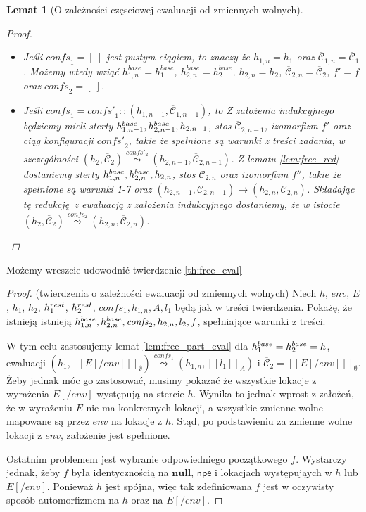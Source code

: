 \documentclass[]{pracamgr}
\renewcommand \| {\hspace{0.75em} | \hspace{0.75em} }
\renewcommand \[ {[\![}
\renewcommand \] {]\!]}
\newcommand \eval [1] {\overset{#1}{\leadsto}}
\newtheorem{lemma}{Lemat}
\theoremstyle{definition}
\newcommand{\jnull}{\mathbf{null}\xspace}
\newcommand{\ctxt}{\mathcal{C}\xspace}
\newcommand{\ctxts}{\overline{\ctxt}}
\newcommand{\npe}{\mathsf{npe}\xspace}
\begin{document}
\begin{lemma}[O zależności częsciowej ewaluacji od zmiennych wolnych]{\ }
\begin{proof}
\begin{itemize}
 \item Jeśli $\mathit{confs}_1 = [\ ]$ jest pustym ciągiem, to znaczy że $h_{1,n} = h_1$ oraz
 $\ctxts_{1,n} = \ctxts_1$.
 Możemy wtedy wziąć $h_{1,n}^{base} = h_1^{base}$, $h_{2,n}^{base} = h_2^{base}$,
 $h_{2,n} = h_2$, $\ctxts_{2,n} = \ctxts_2$, $f' = f$ oraz $\mathit{confs}_2 = [\ ]$.
 \item Jeśli $\mathit{confs}_1 = \mathit{confs'}_1 :: (h_{1,n-1}, \ctxts_{1,n-1})$, to
 Z założenia indukcyjnego będziemy mieli
 sterty $h^{base}_{1, n-1}, h^{base}_{2, n-1}, h_{2, n-1}$, stos $\ctxts_{2, n-1}$, izomorfizm $f'$
 oraz ciąg konfiguracji $\mathit{confs'}_2$, takie że spełnione są warunki z treści zadania,
 w szczególności $(h_2, \ctxts_2) \eval{confs'_2} (h_{2,n-1}, \ctxts_{2, n-1})$.
 Z lematu \ref{lem:free_red} dostaniemy 
 sterty $h^{base}_{1, n}, h^{base}_{2, n}, h_{2, n}$, stos $\ctxts_{2, n}$ oraz izomorfizm $f''$, takie że
 spełnione są warunki 1-7 oraz
 $(h_{2,n-1}, \ctxts_{2,n-1}) \rightarrow (h_{2, n}, \ctxts_{2, n})$.
 Składając tę redukcję z ewaluacją z założenia indukcyjnego dostaniemy, że w istocie
 $(h_2, \ctxts_2) \eval{confs_2} (h_{2, n}, \ctxts_{2, n})$.
\end{itemize}
\end{proof}
\end{lemma}

Możemy wreszcie udowodnić twierdzenie \ref{th:free_eval}
\begin{proof} (twierdzenia o zależności ewaluacji od zmiennych wolnych)
    Niech $h$, $env$, $E$, $h_1$, $h_2$, $h^{rest}_1$, $h^{rest}_2$, $\mathit{confs_1}, h_{1,n}, A, l_1$
    będą jak w treści twierdzenia.
    Pokażę, że istnieją istnieją  $h^{base}_{1, n}, h^{base}_{2, n}, \mathit{confs}_2, h_{2, n}, l_2, f$,
    spełniające warunki z treści.
    
    W tym celu zastosujemy lemat \ref{lem:free_part_eval} dla
    $h^{base}_1 = h^{base}_2 = h$, ewaluacji
    $(h_1, \[ E[/env] \]_\emptyset) \eval{confs_1} (h_{1,n}, \[ l_1 \]_A)$ i
    $\ctxts_2 = \[ E[/env] \]_\emptyset$.
    Żeby jednak móc go zastosować, musimy pokazać że wszystkie lokacje z wyrażenia $E[/env]$
    występują na stercie $h$. Wynika to jednak wprost z założeń, że w wyrażeniu $E$ nie ma
    konkretnych lokacji, a wszystkie zmienne wolne mapowane są przez $env$ na lokacje z $h$.
    Stąd, po podstawieniu za zmienne wolne lokacji z $env$, założenie jest spełnione.
    
    Ostatnim problemem jest wybranie odpowiedniego początkowego $f$.
    Wystarczy jednak, żeby $f$ była identycznością na $\jnull$, $\npe$ i lokacjach występująych
    w $h$ lub $E[/env]$. Ponieważ $h$ jest spójna, więc tak zdefiniowana $f$ jest w oczywisty sposób
    automorfizmem na $h$ oraz na $E[/env]$.
\end{proof}
\end{document}

